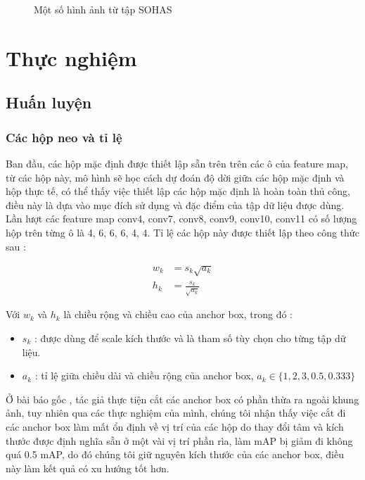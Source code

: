 \documentclass[a4paper]{article}
\begin{document}
\begin{figure}[h]
\begin{multicols}{4}
	\end{multicols}
	\caption{Một số hình ảnh từ tập SOHAS}
	\label{exampleonSOHAS}
\end{figure}


\section{\textbf{Thực nghiệm}}

\subsection{\textbf{Huấn luyện}}

\subsubsection{\textbf{Các hộp neo và tỉ lệ}}

Ban đầu, các hộp mặc định được thiết lập sẵn trên trên các ô của feature map, từ các hộp này, mô hình sẽ học cách dự đoán độ dời giữa các hộp mặc định và hộp thực tế, có thể thấy việc thiết lập các hộp mặc định là hoàn toàn thủ công, điều này là dựa vào mục đích sử dụng và đặc điểm của tập dữ liệu được dùng. Lần lượt các feature map conv4, conv7, conv8, conv9, conv10, conv11 có số lượng hộp trên từng ô là 4, 6, 6, 6, 4, 4. Tỉ lệ các hộp này được thiết lập theo công thức sau :

\begin{align*}
	w_k &= s_k \sqrt{a_k} \\
	h_k &= \frac{s_k}{\sqrt{a_k}}
\end{align*}

Với $w_k$ và $h_k$ là chiều rộng và chiều cao của anchor box, trong đó :
\begin{itemize}
	\item $s_k$ : được dùng để scale kích thước và là tham số tùy chọn cho từng tập dữ liệu.
	\item $a_k$ : tỉ lệ giữa chiều dài và chiều rộng của anchor box, $a_k \in \{1, 2, 3, 0.5, 0.333\}$
\end{itemize}



Ở bài báo gốc \cite{ssd}, tác giả thực tiện cắt các anchor box có phần thừa ra ngoài khung ảnh, tuy nhiên qua các thực nghiệm của mình, chúng tôi nhận thấy việc cắt đi các anchor box làm mất ổn định về vị trí của các hộp do thay đổi tâm và kích thước được định nghĩa sẵn ở một vài vị trí phần rìa, làm mAP bị giảm đi không quá 0.5 mAP, do đó chúng tôi giữ nguyên kích thước của các anchor box, điều này làm kết quả có xu hướng tốt hơn.
\end{document}
